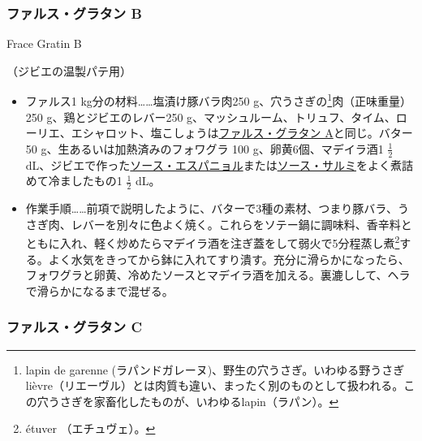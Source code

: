 \begin{recette}
\atoaki{}

\hypertarget{farce-gratin-b}{%
\subsubsection{ファルス・グラタン B}\label{farce-gratin-b}}

\begin{frsubenv}

Frace Gratin B

\end{frsubenv}

（ジビエの温製パテ用）


\begin{itemize}
\item
  ファルス1 kg分の材料\ldots{}\ldots{}塩漬け豚バラ肉250
  g、穴うさぎの\footnote{lapin de garenne
    (ラパンドガレーヌ)、野生の穴うさぎ。いわゆる野うさぎlièvre（リエーヴル）とは肉質も違い、まったく別のものとして扱われる。この穴うさぎを家畜化したものが、いわゆるlapin（ラパン）。}肉（正味重量）250
  g、鶏とジビエのレバー250
  g、マッシュルーム、トリュフ、タイム、ローリエ、エシャロット、塩こしょうは\protect\hyperlink{farce-gratin-a}{ファルス・グラタン
  A}と同じ。バター50 g、生あるいは加熱済みのフォワグラ 100
  g、卵黄6個、マデイラ酒1 \(\frac{1}{2}\)
  dL、ジビエで作った\protect\hyperlink{sauce-espagnole}{ソース・エスパニョル}または\protect\hyperlink{sauce-salmis}{ソース・サルミ}をよく煮詰めて冷ましたもの1
  \(\frac{1}{2}\) dL。
\item
  作業手順\ldots{}\ldots{}前項で説明したように、バターで3種の素材、つまり豚バラ、うさぎ肉、レバーを別々に色よく焼く。これらをソテー鍋に調味料、香辛料とともに入れ、軽く炒めたらマデイラ酒を注ぎ蓋をして弱火で5分程蒸し煮\footnote{étuver
    （エチュヴェ）。}する。よく水気をきってから鉢に入れてすり潰す。充分に滑らかになったら、フォワグラと卵黄、冷めたソースとマデイラ酒を加える。裏漉しして、ヘラで滑らかになるまで混ぜる。
\end{itemize}

\atoaki{}

\hypertarget{farce-gratin-c}{%
\subsubsection{ファルス・グラタン C}\label{farce-gratin-c}}


\end{recette}

